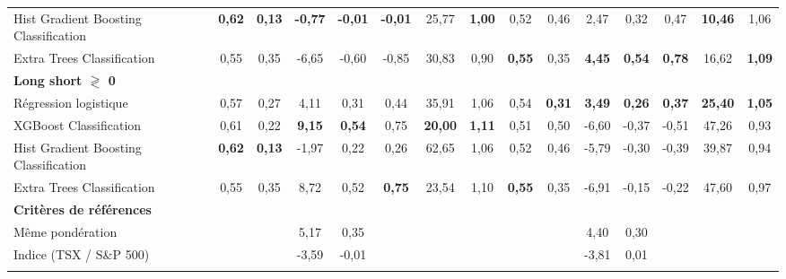 \begin{table}[h]
{\begin{tabular}{l *{7}{S[table-format=3.2]} | *{7}{S[table-format=3.2]}}
Hist Gradient Boosting Classification & \bfseries\color{Green}0,62 & \bfseries\color{Green}0,13 & \bfseries\color{Green}-0,77 & \bfseries\color{Green}-0,01 & \bfseries\color{Green}-0,01 & 25,77 & \bfseries\color{Green}1,00 & 0,52 & 0,46 & 2,47 & 0,32 & 0,47 & \bfseries\color{Green}10,46 & 1,06 \\ \addlinespace[0.1cm]
Extra Trees Classification & 0,55 & 0,35 & -6,65 & -0,60 & -0,85 & 30,83 & 0,90 & \bfseries\color{Green}0,55 & 0,35 & \bfseries\color{Green}4,45 & \bfseries\color{Green}0,54 & \bfseries\color{Green}0,78 & 16,62 & \bfseries\color{Green}1,09 \\ \addlinespace[0.1cm]
\textbf{Long short $\gtrless$ 0} &  &  &  &  &  &  &  &  &  &  &  &  &  & \\
\addlinespace[0.1cm]
Régression logistique & 0,57 & 0,27 & 4,11 & 0,31 & 0,44 & 35,91 & 1,06 & 0,54 & \bfseries\color{Green}0,31 & \bfseries\color{Green}3,49 & \bfseries\color{Green}0,26 & \bfseries\color{Green}0,37 & \bfseries\color{Green}25,40 & \bfseries\color{Green}1,05 \\ \addlinespace[0.1cm]
XGBoost Classification & 0,61 & 0,22 & \bfseries\color{Green}9,15 & \bfseries\color{Green}0,54 & 0,75 & \bfseries\color{Green}20,00 & \bfseries\color{Green}1,11 & 0,51 & 0,50 & -6,60 & -0,37 & -0,51 & 47,26 & 0,93 \\ \addlinespace[0.1cm]
Hist Gradient Boosting Classification & \bfseries\color{Green}0,62 & \bfseries\color{Green}0,13 & -1,97 & 0,22 & 0,26 & 62,65 & 1,06 & 0,52 & 0,46 & -5,79 & -0,30 & -0,39 & 39,87 & 0,94 \\ \addlinespace[0.1cm]
Extra Trees Classification & 0,55 & 0,35 & 8,72 & 0,52 & \bfseries\color{Green}0,75 & 23,54 & 1,10 & \bfseries\color{Green}0,55 & 0,35 & -6,91 & -0,15 & -0,22 & 47,60 & 0,97 \\ \addlinespace[0.1cm]
\textbf{Critères de références} &  &  &  &  &  &  &  &  &  &  &  &  &  & \\
\addlinespace[0.1cm]
Même pondération &  &  & 5,17 & 0,35 &  &  &  &  &  & 4,40 & 0,30 &  &  &  \\ \addlinespace[0.1cm]
Indice (TSX / S\&P 500) &  &  & -3,59 & -0,01 &  &  &  &  &  & -3,81 & 0,01 &  &  &  \\ \addlinespace[0.1cm]
\bottomrule
\end{tabular}}
\end{table}
